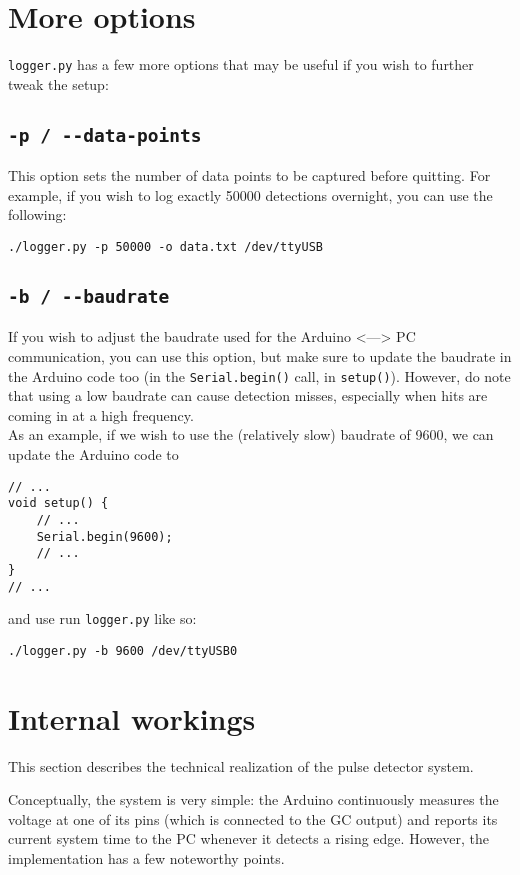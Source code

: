 \documentclass[11pt]{article}
\begin{document}
\section{More options}
\label{sec:orgd1e64cd}
\texttt{logger.py} has a few more options that may be useful if you wish to further tweak the setup:
\subsection{\texttt{-p / -{}-data-points}}
\label{sec:org83eb340}
This option sets the number of data points to be captured before quitting. For example, if you wish to log exactly 50000 detections overnight, you can use the following:
\begin{verbatim}
./logger.py -p 50000 -o data.txt /dev/ttyUSB
\end{verbatim}
\subsection{\texttt{-b / -{}-baudrate}}
\label{sec:org720cd93}
If you wish to adjust the baudrate used for the Arduino <---> PC communication, you can use this option, but make sure to update the baudrate in the Arduino code too (in the \texttt{Serial.begin()} call, in \texttt{setup()}). However, do note that using a low baudrate can cause detection misses, especially when hits are coming in at a high frequency.\\
As an example, if we wish to use the (relatively slow) baudrate of 9600, we can update the Arduino code to 
\begin{verbatim}
// ...
void setup() {
    // ...
    Serial.begin(9600);
    // ...
}
// ...
\end{verbatim}
and use run \texttt{logger.py} like so:
\begin{verbatim}
./logger.py -b 9600 /dev/ttyUSB0
\end{verbatim}

\section{Internal workings}
\label{sec:orgcbdf3a4}
This section describes the technical realization of the pulse detector system.

Conceptually, the system is very simple: the Arduino continuously measures the voltage at one of its pins (which is connected to the GC output) and reports its current system time to the PC whenever it detects a rising edge. However, the implementation has a few noteworthy points.
\end{document}
